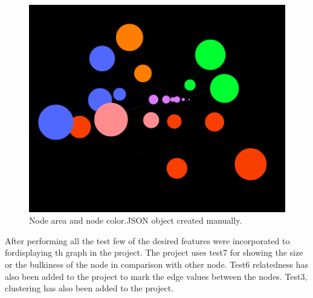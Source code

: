 \begin{enumerate}
\begin{figure}[H]
\centering
\includegraphics[scale=0.3]{t7.png}
\caption{\label{test7}Node area and node color.JSON object created manually.}
\end{figure}
\end{enumerate}

\par After performing all the test few of the desired features were incorporated to fordisplaying th graph in the project. The project uses test7 for showing the size or the bulkiness of the node in comparison with other node. Test6 relatedness has also been added to the project to mark the edge values between the nodes. Test3, clustering has also been added to the project.
